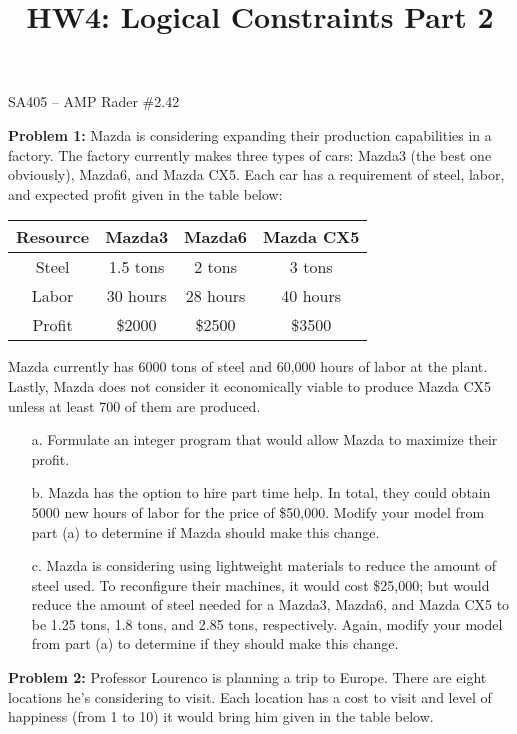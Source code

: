 \documentclass[11pt]{article}
\makeatletter
\theoremstyle{definition}
\renewcommand{\maketitle}{
  \noindent SA405 -- AMP \hfill Rader \#2.42 \\

  \begin{center}\Large{\textbf{\@title}}\end{center}
}
\makeatother
\begin{document}
  
\title{HW4: Logical Constraints Part 2}


\maketitle


\textbf{Problem 1:} Mazda is considering expanding their production capabilities in a factory. The factory currently makes three types of cars: Mazda3 (the best one obviously), Mazda6, and Mazda CX5. Each car has a requirement of steel, labor, and expected profit given in the table below:

\begin{center}
\begin{tabular}{c|ccc} \hline
Resource & Mazda3   & Mazda6   & Mazda CX5 \\ \hline
Steel    & 1.5 tons & 2 tons   & 3 tons  \\
Labor    & 30 hours & 28 hours & 40 hours \\
Profit   & \$2000   & \$2500   & \$3500 \\ \hline
\end{tabular}
\end{center}

Mazda currently has 6000 tons of steel and 60,000 hours of labor at the plant. Lastly, Mazda does not consider it economically viable to produce Mazda CX5 unless at least 700 of them are produced.

\begin{enumerate}
\item[a.] Formulate an integer program that would allow Mazda to maximize their profit.
\item[b.] Mazda has the option to hire part time help. In total, they could obtain 5000 new hours of labor for the price of \$50,000. Modify your model from part (a) to determine if Mazda should make this change.
\item[c.] Mazda is considering using lightweight materials to reduce the amount of steel used. To reconfigure their machines, it would cost \$25,000; but would reduce the amount of steel needed for a Mazda3, Mazda6, and Mazda CX5 to be 1.25 tons, 1.8 tons, and 2.85 tons, respectively. Again, modify your model from part (a) to determine if they should make this change.
\end{enumerate}

\newpage


\textbf{Problem 2:} Professor Lourenco is planning a trip to Europe. There are eight locations he's considering to visit. Each location has a cost to visit and level of happiness (from 1 to 10) it would bring him given in the table below.
\end{document}
